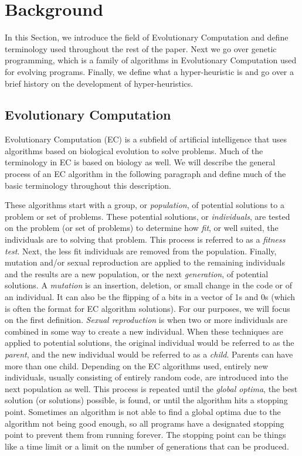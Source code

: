 \documentclass{sig-alternate}
\begin{document}
\section{Background}
\label{sec:background}
In this Section, we introduce the field of Evolutionary Computation and define terminology used throughout the rest of the paper. Next we go over genetic programming, which is a family of algorithms in Evolutionary Computation used for evolving programs. Finally, we define what a hyper-heuristic is and go over a brief history on the development of hyper-heuristics.
\vspace{.8cm}
\subsection{Evolutionary Computation}
\label{sec:evocomp}
Evolutionary Computation (EC) is a subfield of artificial intelligence that uses algorithms based on biological evolution to solve problems. Much of the terminology in EC is based on biology as well. We will describe the general process of an EC algorithm in the following paragraph and define much of the basic terminology throughout this description.

These algorithms start with a group, or \textit{population}, of potential solutions to a problem or set of problems. These potential solutions, or \textit{individuals}, are tested on the problem (or set of problems) to determine how \textit{fit}, or well suited, the individuals are to solving that problem. This process is referred to as a \textit{fitness test}. Next, the less fit individuals are removed from the population. Finally, mutation and/or sexual reproduction are applied to the remaining individuals and the results are a new population, or the next \textit{generation}, of potential solutions. A \textit{mutation} is an insertion, deletion, or small change in the code or of an individual. It can also be the flipping of a bits in a vector of 1s and 0s (which is often the format for EC algorithm solutions). For our purposes, we will focus on the first definition. \textit{Sexual reproduction} is when two or more individuals are combined in some way to create a new individual. When these techniques are applied to potential solutions, the original individual would be referred to as the \textit{parent}, and the new individual would be referred to as a \textit{child}. Parents can have more than one child. Depending on the EC algorithms used, entirely new individuals, usually consisting of entirely random code, are introduced into the next population as well. This process is repeated until the \textit{global optima}, the best solution (or solutions) possible, is found, or until the algorithm hits a stopping point. Sometimes an algorithm is not able to find a global optima due to the algorithm not being good enough, so all programs have a designated stopping point to prevent them from running forever. The stopping point can be things like a time limit or a limit on the number of generations that can be produced.
\end{document}
